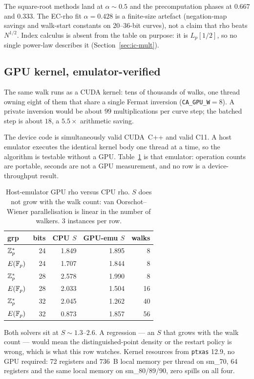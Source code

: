The square-root methods land at $\alpha\sim 0.5$ and the
precomputation phases at $0.667$ and $0.333$. The EC-rho fit
$\alpha=0.428$ is a finite-size artefact (negation-map savings and
walk-start constants on 20--36-bit curves), not a claim that rho
beats $N^{1/2}$. Index calculus is absent from the table on purpose:
it is $L_p[1/2]$, so no single power-law describes it
(Section~\ref{sec:ic-mult}).

\subsection{GPU kernel, emulator-verified}
\label{sec:rho-gpu}

The same walk runs as a CUDA kernel: tens of thousands of walks, one
thread owning eight of them that share a single Fermat inversion
(\texttt{CA\_GPU\_W}${}=8$). A private inversion would be about $99$
multiplications per curve step; the batched step is about $18$, a
$5.5\times$ arithmetic saving.

The device code is simultaneously valid CUDA~C++ and valid C11. A host
emulator executes the identical kernel body one thread at a time, so
the algorithm is testable without a GPU. Table~\ref{tab:gpu-emu} is
that emulator: operation counts are portable, seconds are not a GPU
measurement, and no row is a device-throughput
result.

\begin{table}[t]
\centering
\small
\caption{Host-emulator GPU rho versus CPU rho. $S$ does not grow with
  the walk count: van Oorschot--Wiener parallelisation is linear in
  the number of walkers. 3 instances per row.}
\label{tab:gpu-emu}
\begin{tabular}{@{}lrrrr@{}}
\toprule
grp & bits & CPU $S$ & GPU-emu $S$ & walks \\
\midrule
$\mathbb{Z}_p^*$ & 24 & 1.849 & 1.895 & 8 \\
$E(\mathbb{F}_p)$ & 24 & 1.707 & 1.844 & 8 \\
$\mathbb{Z}_p^*$ & 28 & 2.578 & 1.990 & 8 \\
$E(\mathbb{F}_p)$ & 28 & 2.033 & 1.504 & 16 \\
$\mathbb{Z}_p^*$ & 32 & 2.045 & 1.262 & 40 \\
$E(\mathbb{F}_p)$ & 32 & 0.873 & 1.857 & 56 \\
\bottomrule
\end{tabular}
\end{table}

Both solvers sit at $S\sim 1.3$--$2.6$. A regression --- an $S$ that
grows with the walk count --- would mean the distinguished-point
density or the restart policy is wrong, which is what this row
watches. Kernel resources from \texttt{ptxas} 12.9, no GPU required:
72 registers and $736$~B local memory per thread on sm\_70, 64
registers and the same local memory on sm\_80/89/90, zero spills on
all four.

